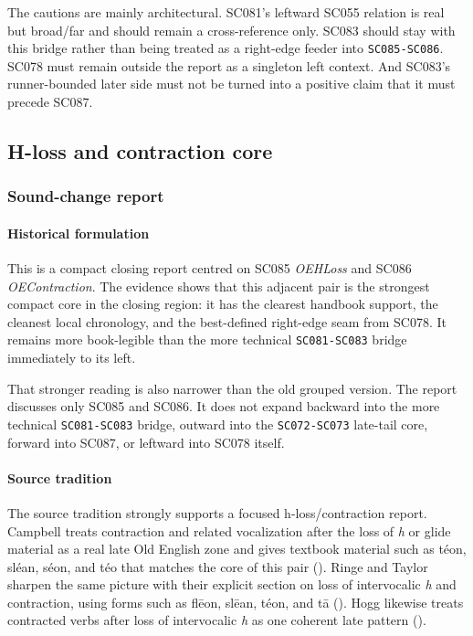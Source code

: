 \documentclass[
  british,
  a4paper,
]{article}
\begin{document}
The cautions are mainly architectural. SC081's leftward SC055 relation
is real but broad/far and should remain a cross-reference only. SC083
should stay with this bridge rather than being treated as a right-edge
feeder into \texttt{SC085-SC086}. SC078 must remain outside the report
as a singleton left context. And SC083's runner-bounded later side must
not be turned into a positive claim that it must precede SC087.

\subsection{H-loss and contraction
core}\label{h-loss-and-contraction-core}

\subsubsection{Sound-change report}\label{sound-change-report-51}

\paragraph{Historical formulation}\label{historical-formulation-51}

This is a compact closing report centred on SC085 \emph{OEHLoss} and
SC086 \emph{OEContraction}. The evidence shows that this adjacent pair
is the strongest compact core in the closing region: it has the clearest
handbook support, the cleanest local chronology, and the best-defined
right-edge seam from SC078. It remains more book-legible than the more
technical \texttt{SC081-SC083} bridge immediately to its left.

That stronger reading is also narrower than the old grouped version. The
report discusses only SC085 and SC086. It does not expand backward into
the more technical \texttt{SC081-SC083} bridge, outward into the
\texttt{SC072-SC073} late-tail core, forward into SC087, or leftward
into SC078 itself.

\paragraph{Source tradition}\label{source-tradition-51}

The source tradition strongly supports a focused h-loss/contraction
report. Campbell treats contraction and related vocalization after the
loss of \emph{h} or glide material as a real late Old English zone and
gives textbook material such as téon, sléan, séon, and téo that matches
the core of this pair (). Ringe and Taylor sharpen the same picture
with their explicit section on loss of intervocalic \emph{h} and
contraction, using forms such as flēon, slēan, téon, and tā
(). Hogg likewise treats contracted verbs after loss of
intervocalic \emph{h} as one coherent late pattern
().
\end{document}
